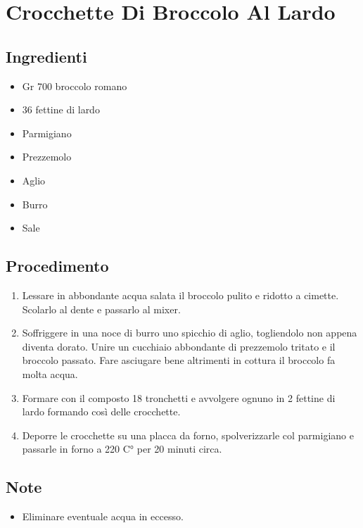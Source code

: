 \section{Crocchette Di Broccolo Al Lardo}
\subsection{Ingredienti}
\begin{itemize}
\item Gr 700 broccolo romano   
\item 36 fettine di lardo  
\item Parmigiano  
\item Prezzemolo  
\item Aglio  
\item Burro  
\item Sale
\end{itemize}
\subsection{Procedimento}
\begin{enumerate}
\item  Lessare in abbondante acqua salata il broccolo pulito e ridotto a cimette. Scolarlo al dente e passarlo al mixer.   
\item  Soffriggere in una noce di burro uno spicchio di aglio, togliendolo non appena diventa dorato. Unire un cucchiaio abbondante di prezzemolo tritato e il broccolo passato. Fare asciugare bene altrimenti in cottura il broccolo fa molta acqua.  
\item  Formare con il composto 18 tronchetti e avvolgere ognuno in 2 fettine di lardo formando così delle crocchette.  
\item  Deporre le crocchette su una placca da forno, spolverizzarle col parmigiano e passarle in forno a 220 C° per 20 minuti circa.
\end{enumerate}
\subsection{Note}
\begin{itemize}
\item Eliminare eventuale acqua in eccesso.
\end{itemize}
